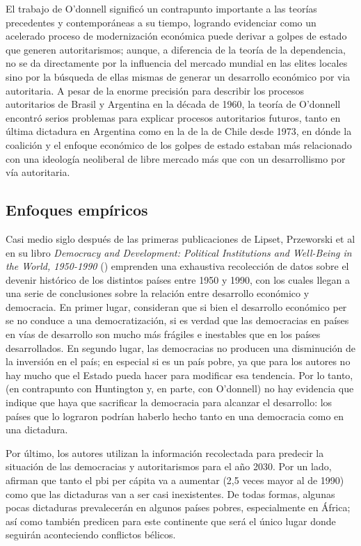 \documentclass{article}
\begin{document}
El trabajo de O'donnell significó un contrapunto importante a las teorías precedentes y
contemporáneas a su tiempo, logrando evidenciar como un acelerado proceso de modernización
económica puede derivar a golpes de estado que generen autoritarismos; aunque, a diferencia
de la teoría de la dependencia, no se da directamente por la influencia del mercado mundial
en las elites locales sino por la búsqueda de ellas mismas de generar un desarrollo económico por via
autoritaria. A pesar de la enorme precisión para describir los procesos autoritarios de 
Brasil y Argentina en la década de 1960, la teoría de O'donnell encontró serios problemas
para explicar procesos autoritarios futuros, tanto en última dictadura en Argentina como en la de
la de Chile desde 1973, en dónde la coalición y el enfoque económico de los golpes de estado
estaban más relacionado con una ideología neoliberal de libre mercado más que con un 
desarrollismo por vía autoritaria.

\subsection{Enfoques empíricos}

Casi medio siglo después de las primeras publicaciones de Lipset, Przeworski et al
en su libro \textit{Democracy and Development: Political Institutions and Well-Being in 
the World, 1950-1990} (\citeyear{przeworski2000democracy}) emprenden una exhaustiva 
recolección de datos sobre el devenir histórico de los distintos países entre 1950 y 
1990, con los cuales llegan a una serie de conclusiones sobre la relación entre 
desarrollo económico y democracia. En 
primer lugar, consideran que si bien el desarrollo económico per se no conduce a una 
democratización, si es verdad que las democracias en países en vías de desarrollo son 
mucho más frágiles e inestables que en los países desarrollados. En segundo lugar,
las democracias no producen una disminución de la inversión en el país; en especial si es
un país pobre, ya que para los autores no hay mucho que el Estado pueda hacer para modificar
esa tendencia. Por lo tanto, (en contrapunto con Huntington y, en parte, con O'donnell) no hay 
evidencia que indique que haya que sacrificar la 
democracia para alcanzar el desarrollo: los países que lo lograron podrían
haberlo hecho tanto en una democracia como en una dictadura.

Por último, los autores utilizan la información recolectada para predecir la situación
de las democracias y autoritarismos para el año 2030. Por un lado, afirman que tanto
el pbi per cápita va a aumentar (2,5 veces mayor al de 1990) 
como que las dictaduras van a ser casi inexistentes. De todas formas, algunas pocas 
dictaduras prevalecerán en algunos países pobres, especialmente en África; así como
también predicen para este continente que será el único lugar donde seguirán aconteciendo
conflictos bélicos.
\end{document}
